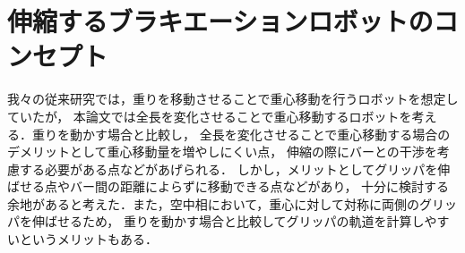 \section{伸縮するブラキエーションロボットのコンセプト}
我々の従来研究では，重りを移動させることで重心移動を行うロボットを想定していたが，
本論文では全長を変化させることで重心移動するロボットを考える．重りを動かす場合と比較し，
全長を変化させることで重心移動する場合のデメリットとして重心移動量を増やしにくい点，
伸縮の際にバーとの干渉を考慮する必要がある点などがあげられる．
しかし，メリットとしてグリッパを伸ばせる点やバー間の距離によらずに移動できる点などがあり，
十分に検討する余地があると考えた．また，空中相において，重心に対して対称に両側のグリッパを伸ばせるため，
重りを動かす場合と比較してグリッパの軌道を計算しやすいというメリットもある．
